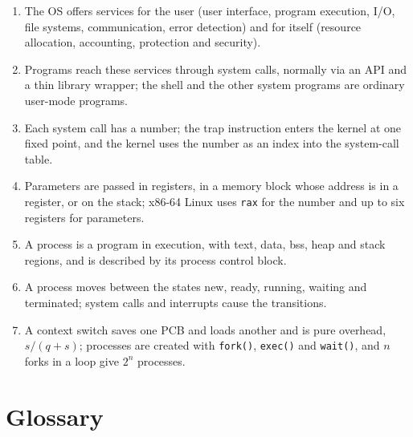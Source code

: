 \documentclass[11pt,a4paper]{article}
\newcommand{\cmd}[1]{\texttt{#1}}
\begin{document}
\begin{keyidea}
\begin{enumerate}[leftmargin=1.4em]
  \item The OS offers services for the user (user interface, program execution, I/O, file systems, communication, error detection) and for itself (resource allocation, accounting, protection and security).
  \item Programs reach these services through system calls, normally via an API and a thin library wrapper; the shell and the other system programs are ordinary user-mode programs.
  \item Each system call has a number; the trap instruction enters the kernel at one fixed point, and the kernel uses the number as an index into the system-call table.
  \item Parameters are passed in registers, in a memory block whose address is in a register, or on the stack; x86-64 Linux uses \texttt{rax} for the number and up to six registers for parameters.
  \item A process is a program in execution, with text, data, bss, heap and stack regions, and is described by its process control block.
  \item A process moves between the states new, ready, running, waiting and terminated; system calls and interrupts cause the transitions.
  \item A context switch saves one PCB and loads another and is pure overhead, $s/(q+s)$; processes are created with \cmd{fork()}, \cmd{exec()} and \cmd{wait()}, and $n$ forks in a loop give $2^{n}$ processes.
\end{enumerate}
\end{keyidea}

\section{Glossary}
\end{document}
